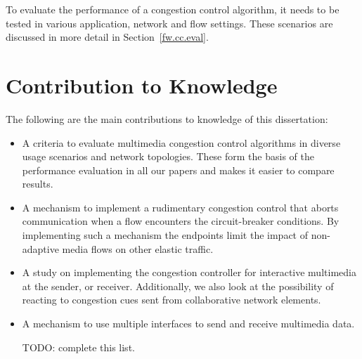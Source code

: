 To evaluate the performance of a congestion control algorithm, it needs to be
tested in various application, network and flow settings. These scenarios
are discussed in more detail in Section~\ref{fw.cc.eval}.

\section{Contribution to Knowledge}

The following are the main contributions to knowledge of this dissertation:

\begin{itemize}

\item A criteria to evaluate multimedia congestion control algorithms in
diverse usage scenarios and network topologies. These form the basis of the
performance evaluation in all our papers and makes it easier to compare
results.

\item A mechanism to implement a rudimentary congestion control that aborts
communication when a flow encounters the circuit-breaker conditions. By
implementing such a mechanism the endpoints limit the impact of non-adaptive
media flows on other elastic traffic.

\item A study on implementing the congestion controller for interactive
multimedia at the sender, or receiver.  Additionally, we also look at the
possibility of reacting to congestion cues sent from collaborative network
elements.

\item A mechanism to use multiple interfaces to send and receive multimedia
data.

{\color{red} TODO: complete this list.}

\end{itemize}